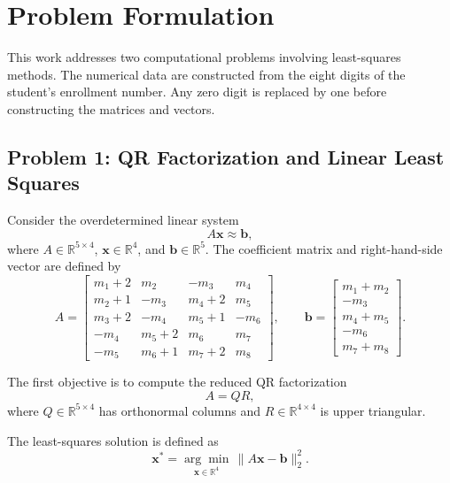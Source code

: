\section{Problem Formulation}
\label{sec:problem}

This work addresses two computational problems involving least-squares
methods. The numerical data are constructed from the eight digits of
the student's enrollment number. Any zero digit is replaced by one
before constructing the matrices and vectors.

\subsection{Problem 1: QR Factorization and Linear Least Squares}

Consider the overdetermined linear system
\begin{equation}
    A\mathbf{x}\approx\mathbf{b},
\end{equation}
where $A\in\mathbb{R}^{5\times4}$, $\mathbf{x}\in\mathbb{R}^{4}$,
and $\mathbf{b}\in\mathbb{R}^{5}$. The coefficient matrix and
right-hand-side vector are defined by
\begin{equation}
    A=
    \begin{bmatrix}
        m_1+2 & m_2   & -m_3  & m_4  \\
        m_2+1 & -m_3  & m_4+2 & m_5  \\
        m_3+2 & -m_4  & m_5+1 & -m_6 \\
        -m_4  & m_5+2 & m_6   & m_7  \\
        -m_5  & m_6+1 & m_7+2 & m_8
    \end{bmatrix},
    \qquad
    \mathbf{b}=
    \begin{bmatrix}
        m_1+m_2 \\
        -m_3    \\
        m_4+m_5 \\
        -m_6    \\
        m_7+m_8
    \end{bmatrix}.
    \label{eq:system-data}
\end{equation}

The first objective is to compute the reduced QR factorization
\begin{equation}
    A=QR,
\end{equation}
where $Q\in\mathbb{R}^{5\times4}$ has orthonormal columns and
$R\in\mathbb{R}^{4\times4}$ is upper triangular.

The least-squares solution is defined as
\begin{equation}
    \mathbf{x}^{*}
    =\underset{\mathbf{x}\in\mathbb{R}^{4}}{\arg\min}
    \,\|A\mathbf{x}-\mathbf{b}\|_2^2.
    \label{eq:ls-first}
\end{equation}

